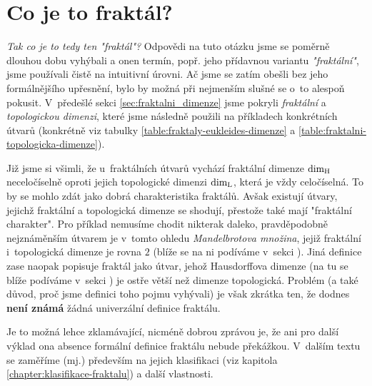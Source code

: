 \section{Co je to fraktál?}\label{sec:co-je-to-fraktal}
\emph{Tak co je to tedy ten "fraktál"?} Odpovědi na tuto otázku jsme se poměrně dlouhou dobu vyhýbali a onen termín, popř. jeho přídavnou variantu \emph{"fraktální"}, jsme používali čistě na intuitivní úrovni. Ač jsme se zatím obešli bez jeho formálnějšího upřesnění, bylo by možná při nejmenším slušné se o~to alespoň pokusit. V~předešlé sekci \ref{sec:fraktalni_dimenze} jsme pokryli \emph{fraktální} a \emph{topologickou dimenzi}, které jsme následně použili na příkladech konkrétních útvarů (konkrétně viz tabulky \ref{table:fraktaly-eukleides-dimenze} a \ref{table:fraktalni-topologicka-dimenze}).

Již jsme si všimli, že u~fraktálních útvarů vychází fraktální dimenze $\operatorname{dim_H}$ neceločíselně oproti jejich topologické dimenzi $\operatorname{dim_L}$, která je vždy celočíselná. To by se mohlo zdát jako dobrá charakteristika fraktálů. Avšak existují útvary, jejichž fraktální a topologická dimenze se shodují, přestože také mají "fraktální charakter". Pro příklad nemusíme chodit nikterak daleko, pravděpodobně nejznáměnším útvarem je v~tomto ohledu \emph{Mandelbrotova množina}, jejiž fraktální i~topologická dimenze je rovna $2$ (blíže se na ni podíváme v~sekci ). Jiná definice zase naopak popisuje fraktál jako útvar, jehož Hausdorffova dimenze (na tu se blíže podíváme v~sekci ) je ostře větší než dimenze topologická. Problém (a také důvod, proč jsme definici toho pojmu vyhývali) je však zkrátka ten, že dodnes \textbf{není známá} žádná univerzální definice fraktálu. \cite[str. 226]{Voracova2022}

Je to možná lehce zklamávající, nicméně dobrou zprávou je, že ani pro další výklad ona absence formální definice fraktálu nebude překážkou. V~dalším textu se zaměříme (mj.) především na jejich klasifikaci (viz kapitola \ref{chapter:klasifikace-fraktalu}) a další vlastnosti.